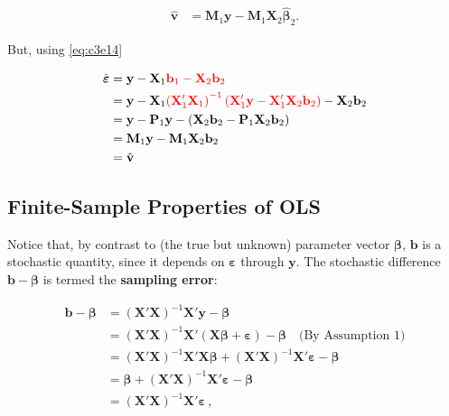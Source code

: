 \documentclass[]{book}
\theoremstyle{definition}
\theoremstyle{definition}
\theoremstyle{definition}
\theoremstyle{remark}
\begin{document}
\[
\begin{align*}
\hat{\mathbf{v}} &= \mathbf{M}_1\mathbf{y}-\mathbf{M}_1\mathbf{X}_2\hat{\boldsymbol{\beta}}_2.
\end{align*}
\]

But, using \eqref{eq:c3e14}

\[
\begin{align*}
\hat{\boldsymbol{\varepsilon}}
&= \mathbf{y}-\mathbf{X}_1{\color{red}{\mathbf{b}_1}-\mathbf{X}_2\mathbf{b}_2} \\
&= \mathbf{y}-\mathbf{X}_1{\color{red}{\left(\mathbf{X}_1'\mathbf{X}_1\right)^{-1}\left(\mathbf{X}_1'\mathbf{y}-\mathbf{X}_1'\mathbf{X}_2\mathbf{b}_2\right)}} -\mathbf{X}_2\mathbf{b}_2\\
&= \mathbf{y}-\mathbf{P}_1\mathbf{y}-\left(\mathbf{X}_2\mathbf{b}_2-\mathbf{P}_1\mathbf{X}_2\mathbf{b}_2 \right)\\
&= \mathbf{M}_1\mathbf{y}-\mathbf{M}_1\mathbf{X}_2\mathbf{b}_2\\
&= \hat{\mathbf{v}}
\end{align*}
\]

\hypertarget{finite-sample-properties-of-ols}{%
\subsection{Finite-Sample Properties of OLS}\label{finite-sample-properties-of-ols}}

Notice that, by contrast to (the true but unknown) parameter vector
\(\boldsymbol{\beta}\), \(\mathbf{b}\) is a stochastic quantity, since it depends on
\(\boldsymbol{\varepsilon}\) through \(\mathbf{y}\). The stochastic difference \(\mathbf{b}-\boldsymbol{\beta}\)
is termed the \textbf{sampling error}:

\[
\begin{align*}
\mathbf{b}-\boldsymbol{\beta} &= (\mathbf{X}'\mathbf{X})^{-1}\mathbf{X}'\mathbf{y}-\boldsymbol{\beta}\\
 &= (\mathbf{X}'\mathbf{X})^{-1}\mathbf{X}'(\mathbf{X}\boldsymbol{\beta}+\boldsymbol{\varepsilon})-\boldsymbol{\beta}\quad\text{(By Assumption 1)}\\
 &= (\mathbf{X}'\mathbf{X})^{-1}\mathbf{X}'\mathbf{X}\boldsymbol{\beta}+(\mathbf{X}'\mathbf{X})^{-1}\mathbf{X}'\boldsymbol{\varepsilon}-\boldsymbol{\beta}\\
 &= \boldsymbol{\beta}+(\mathbf{X}'\mathbf{X})^{-1}\mathbf{X}'\boldsymbol{\varepsilon}-\boldsymbol{\beta}\\
 &= (\mathbf{X}'\mathbf{X})^{-1}\mathbf{X}'\boldsymbol{\varepsilon} \,, 
\end{align*}
\]
\end{document}
